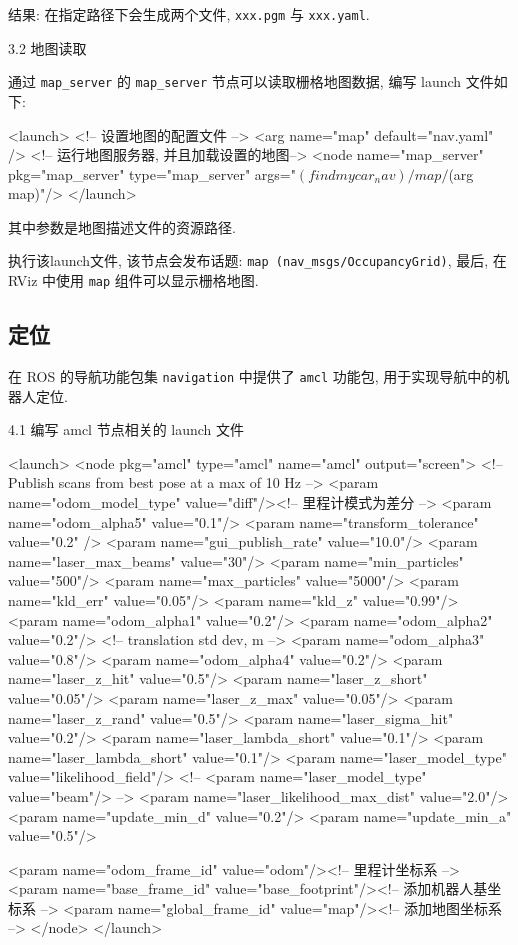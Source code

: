 \documentclass[openany, fontset=windowsold]{ctexbook}
\theoremstyle{kaiti}
\theoremstyle{normal}
\begin{document}
结果: 在指定路径下会生成两个文件, \verb|xxx.pgm| 与 \verb|xxx.yaml|.

3.2 地图读取

通过 \verb|map_server| 的 \verb|map_server| 节点可以读取栅格地图数据, 编写 launch 文件如下:

\begin{xml}
  <launch>
      <!-- 设置地图的配置文件 -->
      <arg name="map" default="nav.yaml" />
      <!-- 运行地图服务器, 并且加载设置的地图-->
      <node name="map_server" pkg="map_server" type="map_server" args="$(find mycar_nav)/map/$(arg map)"/>
  </launch>
\end{xml}

其中参数是地图描述文件的资源路径.

执行该launch文件, 该节点会发布话题: \verb|map (nav_msgs/OccupancyGrid)|, 最后, 在 RViz 中使用 \verb|map| 组件可以显示栅格地图.

\subsection{定位}

在 ROS 的导航功能包集 \verb|navigation| 中提供了 \verb|amcl| 功能包, 用于实现导航中的机器人定位.

4.1 编写 amcl 节点相关的 launch 文件

\begin{xml}
  <launch>
    <node pkg="amcl" type="amcl" name="amcl" output="screen">
      <!-- Publish scans from best pose at a max of 10 Hz -->
      <param name="odom_model_type" value="diff"/><!-- 里程计模式为差分 -->
      <param name="odom_alpha5" value="0.1"/>
      <param name="transform_tolerance" value="0.2" />
      <param name="gui_publish_rate" value="10.0"/>
      <param name="laser_max_beams" value="30"/>
      <param name="min_particles" value="500"/>
      <param name="max_particles" value="5000"/>
      <param name="kld_err" value="0.05"/>
      <param name="kld_z" value="0.99"/>
      <param name="odom_alpha1" value="0.2"/>
      <param name="odom_alpha2" value="0.2"/>
      <!-- translation std dev, m -->
      <param name="odom_alpha3" value="0.8"/>
      <param name="odom_alpha4" value="0.2"/>
      <param name="laser_z_hit" value="0.5"/>
      <param name="laser_z_short" value="0.05"/>
      <param name="laser_z_max" value="0.05"/>
      <param name="laser_z_rand" value="0.5"/>
      <param name="laser_sigma_hit" value="0.2"/>
      <param name="laser_lambda_short" value="0.1"/>
      <param name="laser_lambda_short" value="0.1"/>
      <param name="laser_model_type" value="likelihood_field"/>
      <!-- <param name="laser_model_type" value="beam"/> -->
      <param name="laser_likelihood_max_dist" value="2.0"/>
      <param name="update_min_d" value="0.2"/>
      <param name="update_min_a" value="0.5"/>

      <param name="odom_frame_id" value="odom"/><!-- 里程计坐标系 -->
      <param name="base_frame_id" value="base_footprint"/><!-- 添加机器人基坐标系 -->
      <param name="global_frame_id" value="map"/><!-- 添加地图坐标系 -->
    </node>
  </launch>
\end{xml}
\end{document}
